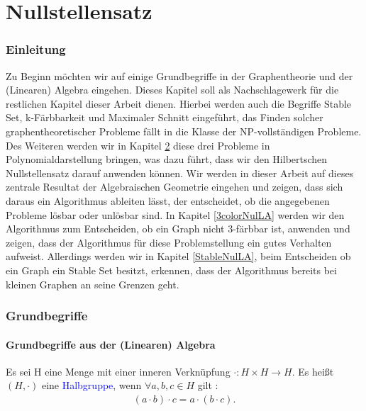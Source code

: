 
\part*{Nullstellensatz}


\section{Einleitung}

Zu Beginn möchten wir auf einige Grundbegriffe in der Graphentheorie und der (Linearen) Algebra eingehen. Dieses Kapitel soll als Nachschlagewerk für die restlichen Kapitel dieser Arbeit dienen. Hierbei werden auch die Begriffe Stable Set, k-Färbbarkeit und Maximaler Schnitt eingeführt, das Finden solcher graphentheoretischer Probleme fällt in die Klasse der NP-vollständigen Probleme. Des Weiteren werden wir in Kapitel \ref{Grundbegriffe} diese drei Probleme in Polynomialdarstellung  bringen, was dazu führt, dass wir den Hilbertschen Nullstellensatz darauf anwenden können. Wir werden in dieser Arbeit auf dieses zentrale Resultat der Algebraischen Geometrie eingehen und zeigen, dass sich daraus ein Algorithmus ableiten lässt, der entscheidet, ob die angegebenen Probleme lösbar oder unlösbar sind. In Kapitel \ref{3colorNulLA} werden wir den Algorithmus zum Entscheiden, ob ein Graph nicht 3-färbbar ist, anwenden und zeigen, dass der Algorithmus für diese Problemstellung ein gutes Verhalten aufweist. Allerdings werden wir in Kapitel \ref{StableNulLA}, beim Entscheiden ob ein Graph ein Stable Set besitzt, erkennen, dass der Algorithmus bereits bei kleinen Graphen an seine Grenzen geht.

\section{Grundbegriffe}  \label{Grundbegriffe}

\subsection{Grundbegriffe aus der (Linearen) Algebra}

\begin{definition}
Es sei H eine Menge mit einer inneren Verknüpfung $\cdot : H \times H \rightarrow H$. Es heißt $(H,\cdot)$ eine \textcolor{blue}{Halbgruppe}, wenn $\forall a,b,c \in H$ gilt \cite{Karpfinger}: 
\begin{align*}
(a \cdot b) \cdot c = a \cdot ( b \cdot c ).
\end{align*}
\end{definition}

